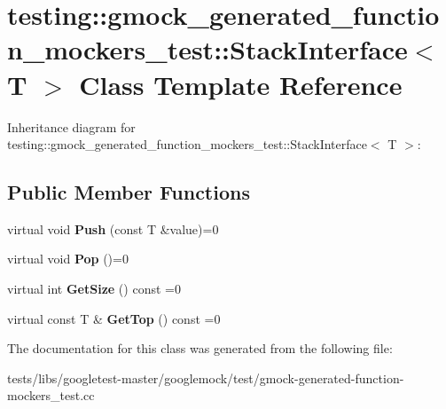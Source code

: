 \hypertarget{classtesting_1_1gmock__generated__function__mockers__test_1_1StackInterface}{}\section{testing\+:\+:gmock\+\_\+generated\+\_\+function\+\_\+mockers\+\_\+test\+:\+:Stack\+Interface$<$ T $>$ Class Template Reference}
\label{classtesting_1_1gmock__generated__function__mockers__test_1_1StackInterface}


Inheritance diagram for testing\+:\+:gmock\+\_\+generated\+\_\+function\+\_\+mockers\+\_\+test\+:\+:Stack\+Interface$<$ T $>$\+:
\subsection*{Public Member Functions}
\begin{DoxyCompactItemize}
\item 
\mbox{\label{classtesting_1_1gmock__generated__function__mockers__test_1_1StackInterface_a49448f6195021fee947d37b80b6e5d30}} 
virtual void {\bfseries Push} (const T \&value)=0
\item 
\mbox{\label{classtesting_1_1gmock__generated__function__mockers__test_1_1StackInterface_a1a6646d1d9febe90c607b9b3e4539b67}} 
virtual void {\bfseries Pop} ()=0
\item 
\mbox{\label{classtesting_1_1gmock__generated__function__mockers__test_1_1StackInterface_a537ec8647a2333f50e5f923a85b90eba}} 
virtual int {\bfseries Get\+Size} () const =0
\item 
\mbox{\label{classtesting_1_1gmock__generated__function__mockers__test_1_1StackInterface_af36e32b9ae568100363466d1ebf95364}} 
virtual const T \& {\bfseries Get\+Top} () const =0
\end{DoxyCompactItemize}


The documentation for this class was generated from the following file\+:\begin{DoxyCompactItemize}
\item 
tests/libs/googletest-\/master/googlemock/test/gmock-\/generated-\/function-\/mockers\+\_\+test.\+cc\end{DoxyCompactItemize}
